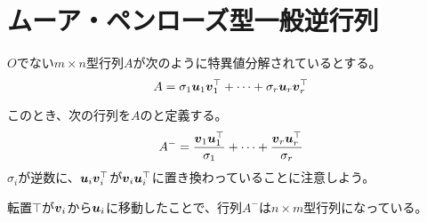 \documentclass[../../../topic_linear-algebra]{subfiles}
\begin{document}
\sectionline
\section{ムーア・ペンローズ型一般逆行列}

$O$でない$m \times n$型行列$A$が次のように特異値分解されているとする。
\begin{equation*}
  A = \sigma_1\vb*{u}_1\vb*{v}_1^\top + \cdots + \sigma_r \vb*{u}_r \vb*{v}_r^\top
\end{equation*}

このとき、次の行列を$A$のと定義する。
\begin{equation*}
  A^- = \frac{\vb*{v}_1\vb*{u}_1^\top}{\sigma_1} + \cdots + \frac{\vb*{v}_r\vb*{u}_r^\top}{\sigma_r}
\end{equation*}
$\sigma_i$が逆数に、$\vb*{u}_i\vb*{v}_i^\top$が$\vb*{v}_i\vb*{u}_i^\top$に置き換わっていることに注意しよう。

\br

転置$\top$が$\vb*{v}_i$から$\vb*{u}_i$に移動したことで、行列$A^-$は$n \times m$型行列になっている。

\todo{}
\end{document}
